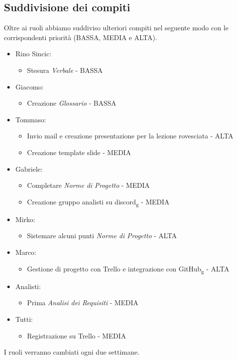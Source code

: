 \subsection{Suddivisione dei compiti}
Oltre ai ruoli abbiamo suddiviso ulteriori compiti nel seguente modo con le corrispondenti priorità (BASSA, MEDIA e ALTA).
\begin{itemize}
    \item Rino Sincic:
    \begin{itemize}
        \item Stesura \textit{Verbale} - BASSA
    \end{itemize}
    \item Giacomo:
    \begin{itemize}
        \item Creazione \textit{Glossario} - BASSA
    \end{itemize}
    \item Tommaso:
    \begin{itemize}
        \item Invio mail e creazione presentazione per la lezione rovesciata - ALTA
        \item Creazione template slide - MEDIA
    \end{itemize}
    \item Gabriele:
    \begin{itemize}
        \item Completare \textit{Norme di Progetto} - MEDIA
        \item Creazione gruppo analisti su discord\textsubscript{g} - MEDIA
    \end{itemize}
    \item Mirko:
    \begin{itemize}
        \item Sistemare alcuni punti \textit{Norme di Progetto} - ALTA
    \end{itemize}
\newpage
    \item Marco:
    \begin{itemize}
        \item Gestione di progetto con Trello e integrazione con GitHub\textsubscript{g} - ALTA
    \end{itemize}
    \item Analisti:
    \begin{itemize}
        \item Prima \textit{Analisi dei Requisiti} - MEDIA
    \end{itemize}
    \item Tutti:
    \begin{itemize}
        \item Registrazione su Trello - MEDIA
    \end{itemize}
\end{itemize}
I ruoli verranno cambiati ogni due settimane.
